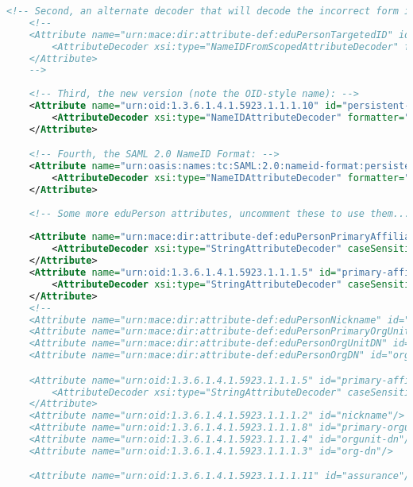 \begin{lstlisting}[language=xml]
    <!-- Second, an alternate decoder that will decode the incorrect form into the newer form. -->
    <!--
    <Attribute name="urn:mace:dir:attribute-def:eduPersonTargetedID" id="persistent-id">
        <AttributeDecoder xsi:type="NameIDFromScopedAttributeDecoder" formatter="$NameQualifier!$SPNameQualifier!$Name" defaultQualifiers="true"/>
    </Attribute>
    -->
    
    <!-- Third, the new version (note the OID-style name): -->
    <Attribute name="urn:oid:1.3.6.1.4.1.5923.1.1.1.10" id="persistent-id">
        <AttributeDecoder xsi:type="NameIDAttributeDecoder" formatter="$NameQualifier!$SPNameQualifier!$Name" defaultQualifiers="true"/>
    </Attribute>

    <!-- Fourth, the SAML 2.0 NameID Format: -->
    <Attribute name="urn:oasis:names:tc:SAML:2.0:nameid-format:persistent" id="persistent-id">
        <AttributeDecoder xsi:type="NameIDAttributeDecoder" formatter="$NameQualifier!$SPNameQualifier!$Name" defaultQualifiers="true"/>
    </Attribute>
    
    <!-- Some more eduPerson attributes, uncomment these to use them... -->
    
    <Attribute name="urn:mace:dir:attribute-def:eduPersonPrimaryAffiliation" id="primary-affiliation">
        <AttributeDecoder xsi:type="StringAttributeDecoder" caseSensitive="false"/>
    </Attribute>
    <Attribute name="urn:oid:1.3.6.1.4.1.5923.1.1.1.5" id="primary-affiliation">
        <AttributeDecoder xsi:type="StringAttributeDecoder" caseSensitive="false"/>
    </Attribute>
    <!--
    <Attribute name="urn:mace:dir:attribute-def:eduPersonNickname" id="nickname"/>
    <Attribute name="urn:mace:dir:attribute-def:eduPersonPrimaryOrgUnitDN" id="primary-orgunit-dn"/>
    <Attribute name="urn:mace:dir:attribute-def:eduPersonOrgUnitDN" id="orgunit-dn"/>
    <Attribute name="urn:mace:dir:attribute-def:eduPersonOrgDN" id="org-dn"/>

    <Attribute name="urn:oid:1.3.6.1.4.1.5923.1.1.1.5" id="primary-affiliation">
        <AttributeDecoder xsi:type="StringAttributeDecoder" caseSensitive="false"/>
    </Attribute>
    <Attribute name="urn:oid:1.3.6.1.4.1.5923.1.1.1.2" id="nickname"/>
    <Attribute name="urn:oid:1.3.6.1.4.1.5923.1.1.1.8" id="primary-orgunit-dn"/>
    <Attribute name="urn:oid:1.3.6.1.4.1.5923.1.1.1.4" id="orgunit-dn"/>
    <Attribute name="urn:oid:1.3.6.1.4.1.5923.1.1.1.3" id="org-dn"/>

    <Attribute name="urn:oid:1.3.6.1.4.1.5923.1.1.1.11" id="assurance"/>
    

\end{lstlisting}
